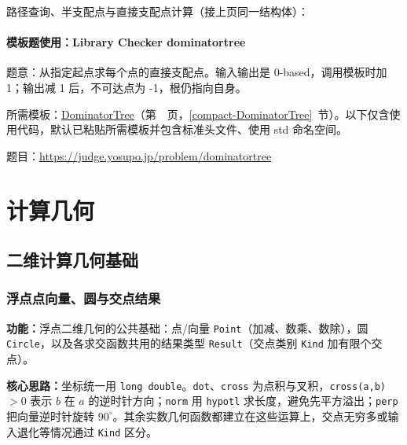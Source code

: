 \Needspace{532pt}



\newpage

\noindent 路径查询、半支配点与直接支配点计算（接上页同一结构体）：



\Needspace{337pt}

\subsection*{模板题使用：Library Checker dominatortree}

\label{usage-example-82}

题意：从指定起点求每个点的直接支配点。输入输出是 0-based，调用模板时加 1；输出减 1 后，不可达点为 -1，根仍指向自身。

所需模板：\hyperref[compact-DominatorTree]{DominatorTree}（第~\pageref{compact-DominatorTree}~页，\ref{compact-DominatorTree}~节）。以下仅含使用代码，默认已粘贴所需模板并包含标准头文件、使用 std 命名空间。

题目：\url{https://judge.yosupo.jp/problem/dominatortree}



\part{计算几何}

\Needspace{180pt}

\chapter{二维计算几何基础}

\section{浮点点向量、圆与交点结果}\label{compact-RealPlane}

\noindent\textbf{功能：}\allowbreak 浮点二维几何的公共基础：点/向量 \texttt{Point}（加减、数乘、数除），圆 \texttt{Circle}，以及各求交函数共用的结果类型 \texttt{Result}（交点类别 \texttt{Kind} 加有限个交点）。

\textbf{核心思路：}\allowbreak 坐标统一用 \texttt{long double}。\texttt{dot}、\texttt{cross} 为点积与叉积，\texttt{cross(a,b)} $>0$ 表示 $b$ 在 $a$ 的逆时针方向；\texttt{norm} 用 \texttt{hypotl} 求长度，避免先平方溢出；\texttt{perp} 把向量逆时针旋转 $90^\circ$。其余实数几何函数都建立在这些运算上，交点无穷多或输入退化等情况通过 \texttt{Kind} 区分。



